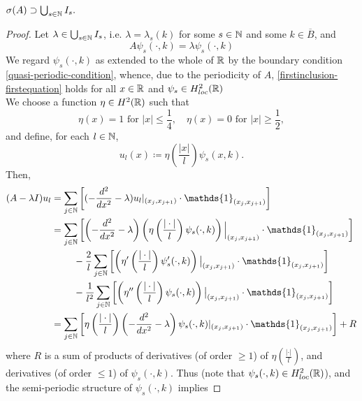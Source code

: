 \begin{theorem}
	$\sigma(A) \supset \bigcup_{s \in \mathbb{N}} I_{s}.$
	
	\begin{proof}
		Let $\lambda \in \bigcup_{s \in \mathbb{N}} I_{s}$, i.e. $\lambda = \lambda_{s}(k)$ for some $s \in \mathbb{N}$ and some $k \in \overline{B}$, and 
		\begin{equation}
			A \psi_{s}(\cdot, k) = \lambda \psi_{s}(\cdot, k) \label{firstinclusion-firstequation}
		\end{equation}
		We regard $\psi_{s}(\cdot, k)$ as extended to the whole of $\mathbb{R}$ by the boundary condition \eqref{quasi-periodic-condition}, whence, due to the periodicity of $A$, \eqref{firstinclusion-firstequation} holds for all $x \in \mathbb{R}$ and $\psi_{s} \in H^{2}_{loc}(\mathbb{R})$ \\
		We choose a function $\eta \in H^{2}(\mathbb{R})$ such that
			\[ \eta(x) = 1 \text{ for } |x| \leq \frac{1}{4}, \quad \eta(x) = 0 \text{ for } |x| \geq \frac{1}{2}, \]
		and define, for each $l \in \mathbb{N}$,
			\[ u_{l}(x) \coloneqq \eta\left(\frac{|x|}{l}\right) \psi_{s}(x, k). \]
	 	Then,
		\begin{align}
			(A - \lambda I) u_{l} & = \sum_{j \in \N} \left[ (- \frac{d^{2}}{dx^{2}} - \lambda) u_{l}|_{(x_{j}, x_{j+1})} \cdot \mathds{1}_{(x_{j}, x_{j+1})} \right] \label{eq:sepofspectraleq} \\
				& = \sum_{j \in \N} \left[ \left(- \frac{d^{2}}{dx^{2}} - \lambda \right) \left( \eta\left(\frac{|\cdot|}{l}\right) \psi_{s}(\cdot, k) \right)\Big|_{(x_{j}, x_{j+1})} \cdot \mathds{1}_{(x_{j}, x_{j+1})} \right] \notag \\
				& ~\qquad - \frac{2}{l} \sum_{j \in \N} \left[ \left( \eta'\left(\frac{|\cdot|}{l}\right) \psi_{s}'(\cdot, k) \right)\big|_{(x_{j}, x_{j+1})} \cdot \mathds{1}_{(x_{j}, x_{j+1})}  \right] \notag \\
				& ~\qquad - \frac{1}{l^{2}} \sum_{j \in \N} \left[ \left( \eta''\left(\frac{|\cdot|}{l}\right) \psi_{s}(\cdot, k) \right)\big|_{(x_{j}, x_{j+1})} \cdot \mathds{1}_{(x_{j}, x_{j+1})} \right] \notag \\
				& = \sum_{j \in \N} \left[ \eta\left(\frac{|\cdot|}{l}\right) \left(- \frac{d^{2}}{dx^{2}} - \lambda \right) \psi_{s}(\cdot, k) |_{(x_{j}, x_{j+1})} \cdot \mathds{1}_{(x_{j}, x_{j+1})} \right] + R \notag
		\end{align}
		where $R$ is a sum of products of derivatives (of order $\geq 1$) of $\eta(\frac{|\cdot|}{l})$, and derivatives (of order $\leq 1$) of $\psi_{s}(\cdot, k)$. Thus (note that $\psi_{s}(\cdot, k) \in H^{2}_{loc}(\mathbb{R})$), and the semi-periodic structure of $\psi_{s}(\cdot, k)$ implies

\end{proof}
\end{theorem}
